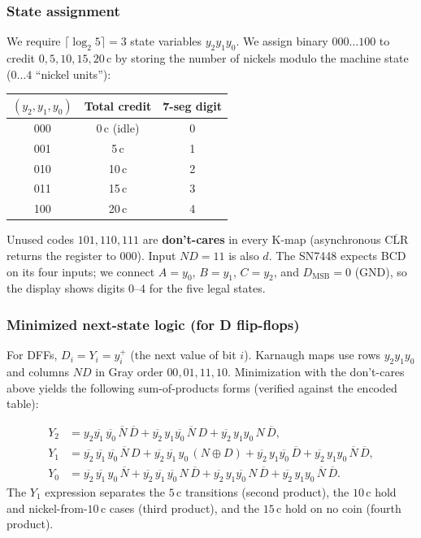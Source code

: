 \documentclass[12pt, letterpaper]{article}
\begin{document}
\subsubsection*{State assignment}

We require $\lceil \log_2 5\rceil = 3$ state variables $y_2y_1y_0$.  We assign binary
$000\ldots 100$ to credit $0,5,10,15,20$\,c by storing the number of nickels modulo the
machine state ($0\ldots 4$ ``nickel units''):

\begin{center}
\begin{tabular}{@{}ccc@{}}
  \toprule
  $(y_2,y_1,y_0)$ & Total credit & 7-seg digit \\
  \midrule
  000 & 0\,c (idle) & 0 \\
  001 & 5\,c & 1 \\
  010 & 10\,c & 2 \\
  011 & 15\,c & 3 \\
  100 & 20\,c & 4 \\
  \bottomrule
\end{tabular}
\end{center}

Unused codes $101,110,111$ are \textbf{don't-cares} in every K-map (asynchronous
$\overline{\text{CLR}}$ returns the register to $000$).  Input $ND{=}11$ is also $d$.
The SN7448 expects BCD on its four inputs; we connect $A{=}y_0$, $B{=}y_1$, $C{=}y_2$, and
$D_{\text{MSB}}{=}0$ (GND), so the display shows digits $0$--$4$ for the five legal states.

\subsubsection*{Minimized next-state logic (for D flip-flops)}

For DFFs, $D_i = Y_i = y_i^+$ (the next value of bit $i$).  Karnaugh maps use rows
$y_2y_1y_0$ and columns $ND$ in Gray order $00,01,11,10$.  Minimization with the don't-cares
above yields the following sum-of-products forms (verified against the encoded table):

\begin{align*}
  Y_2 &= y_2\overline{y_1}\,\overline{y_0}\,\overline{N}\,\overline{D}
        + \overline{y_2}\,y_1\overline{y_0}\,\overline{N}\,D
        + \overline{y_2}\,y_1 y_0\,N\,\overline{D}, \\
  Y_1 &= \overline{y_2}\,\overline{y_1}\,\overline{y_0}\,\overline{N}\,D
        + \overline{y_2}\,\overline{y_1}\,y_0\,(N \oplus D)
        + \overline{y_2}\,y_1\overline{y_0}\,\overline{D}
        + \overline{y_2}\,y_1 y_0\,\overline{N}\,\overline{D}, \\
  Y_0 &= \overline{y_2}\,\overline{y_1}\,y_0\,\overline{N}
        + \overline{y_2}\,\overline{y_1}\,\overline{y_0}\,N\,\overline{D}
        + \overline{y_2}\,y_1\overline{y_0}\,N\,\overline{D}
        + \overline{y_2}\,y_1 y_0\,\overline{N}\,\overline{D}.
\end{align*}
The $Y_1$ expression separates the $5$\,c transitions (second product), the $10$\,c hold and
nickel-from-$10$\,c cases (third product), and the $15$\,c hold on no coin (fourth product).
\end{document}
